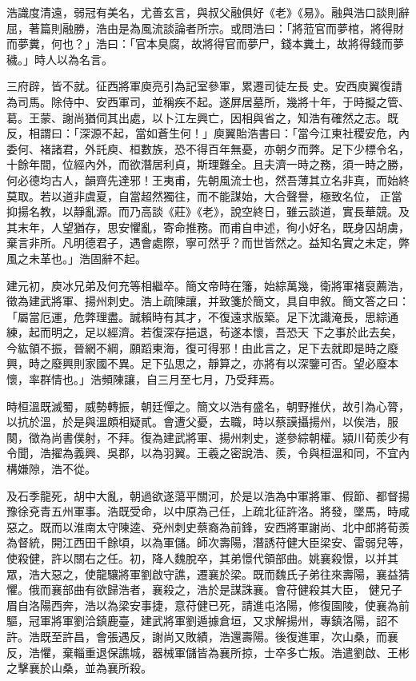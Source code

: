 \begin{pinyinscope}
 浩識度清遠，弱冠有美名，尤善玄言，與叔父融俱好《老》《易》。融與浩口談則辭屈，著篇則融勝，浩由是為風流談論者所宗。或問浩曰：「將蒞官而夢棺，將得財而夢糞，何也？」浩曰：「官本臭腐，故將得官而夢尸，錢本糞土，故將得錢而夢穢。」時人以為名言。



 三府辟，皆不就。征西將軍庾亮引為記室參軍，累遷司徒左長
 史。安西庾翼復請為司馬。除侍中、安西軍司，並稱疾不起。遂屏居墓所，幾將十年，于時擬之管、葛。王蒙、謝尚猶伺其出處，以卜江左興亡，因相與省之，知浩有確然之志。既反，相謂曰：「深源不起，當如蒼生何！」庾翼貽浩書曰：「當今江東社稷安危，內委何、褚諸君，外託庾、桓數族，恐不得百年無憂，亦朝夕而弊。足下少標令名，十餘年間，位經內外，而欲潛居利貞，斯理難全。且夫濟一時之務，須一時之勝，何必德均古人，韻齊先達邪！王夷甫，先朝風流士也，然吾薄其立名非真，而始終莫取。若以道非虞夏，自當超然獨往，而不能謀始，大合聲譽，極致名位，
 正當抑揚名教，以靜亂源。而乃高談《莊》《老》，說空終日，雖云談道，實長華競。及其末年，人望猶存，思安懼亂，寄命推務。而甫自申述，徇小好名，既身囚胡虜，棄言非所。凡明德君子，遇會處際，寧可然乎？而世皆然之。益知名實之未定，弊風之未革也。」浩固辭不起。



 建元初，庾冰兄弟及何充等相繼卒。簡文帝時在籓，始綜萬幾，衛將軍褚裒薦浩，徵為建武將軍、揚州刺史。浩上疏陳讓，并致箋於簡文，具自申敘。簡文答之曰：「屬當厄運，危弊理盡。誠賴時有其才，不復遠求版築。足下沈識淹長，思綜通練，起而明之，足以經濟。若復深存挹退，茍遂本懷，吾恐天
 下之事於此去矣，今紘領不振，晉網不綱，願蹈東海，復可得邪！由此言之，足下去就即是時之廢興，時之廢興則家國不異。足下弘思之，靜算之，亦將有以深鑒可否。望必廢本懷，率群情也。」浩頻陳讓，自三月至七月，乃受拜焉。



 時桓溫既滅蜀，威勢轉振，朝廷憚之。簡文以浩有盛名，朝野推伏，故引為心膂，以抗於溫，於是與溫頗相疑貳。會遭父憂，去職，時以蔡謨攝揚州，以俟浩，服闋，徵為尚書僕射，不拜。復為建武將軍、揚州刺史，遂參綜朝權。潁川荀羨少有令聞，浩擢為義興、吳郡，以為羽翼。王羲之密說浩、羨，令與桓溫和同，不宜內構嫌隙，浩不從。



 及石季龍死，胡中大亂，朝過欲遂蕩平關河，於是以浩為中軍將軍、假節、都督揚豫徐兗青五州軍事。浩既受命，以中原為己任，上疏北征許洛。將發，墜馬，時咸惡之。既而以淮南太守陳逵、兗州刺史蔡裔為前鋒，安西將軍謝尚、北中郎將荀羨為督統，開江西田千餘頃，以為軍儲。師次壽陽，潛誘苻健大臣梁安、雷弱兒等，使殺健，許以關右之任。初，降人魏脫卒，其弟憬代領部曲。姚襄殺憬，以并其眾，浩大惡之，使龍驤將軍劉啟守譙，遷襄於梁。既而魏氏子弟往來壽陽，襄益猜懼。俄而襄部曲有欲歸浩者，襄殺之，浩於是謀誅襄。會苻健殺其大臣，
 健兄子眉自洛陽西奔，浩以為梁安事捷，意苻健已死，請進屯洛陽，修復園陵，使襄為前驅，冠軍將軍劉洽鎮鹿臺，建武將軍劉遁據倉垣，又求解揚州，專鎮洛陽，詔不許。浩既至許昌，會張遇反，謝尚又敗績，浩還壽陽。後復進軍，次山桑，而襄反，浩懼，棄輜重退保譙城，器械軍儲皆為襄所掠，士卒多亡叛。浩遣劉啟、王彬之擊襄於山桑，並為襄所殺。




\end{pinyinscope}
